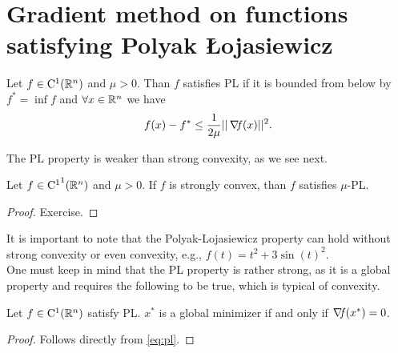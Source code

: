 \documentclass[10pt,a4paper]{article}
\begin{document}
\section{Gradient method on functions satisfying Polyak \L ojasiewicz}
\begin{definition} Let $f\in \mathord{\mathrm{C^1}}(\mathbb{R}^n)$ and $\mu>0$. Than $f$ satisfies PL if it is bounded from below by $f^*=\inf f$ and $\forall x\in \mathbb{R}^n$ we have 
\begin{equation}\label{eq:pl}
	f(x) - f^* \leq \frac{1}{2\mu} ||\operatorname*{\mathit{\nabla \!f}}(x)||^2.
\end{equation}
\end{definition}
\noindent The PL property is weaker than strong convexity, as we see next.
\begin{lemma}
	Let $f\in \mathord{\mathrm{C^1}}^1(\mathbb{R}^n)$ and $\mu>0$. If $f$ is strongly convex, than $f$ satisfies $\mu$-PL.
\end{lemma}
\begin{proof}
	Exercise.
\end{proof}
It is important to note that the Polyak-Lojasiewicz property can hold without strong convexity
or even convexity, e.g., $f(t)=t^2+3\sin(t)^2$.\\
One must keep in mind that the PL property is rather strong, as it is a global property and
requires the following to be true, which is typical of convexity.
\begin{lemma}
	Let $f\in \mathord{\mathrm{C^1}}(\mathbb{R}^n)$ satisfy PL. $x^*$ is a global minimizer if and only if $\operatorname*{\mathit{\nabla \!f}}(x^*)=0$.
\end{lemma}
\begin{proof}
	Follows directly from \eqref{eq:pl}.
\end{proof}
\end{document}
